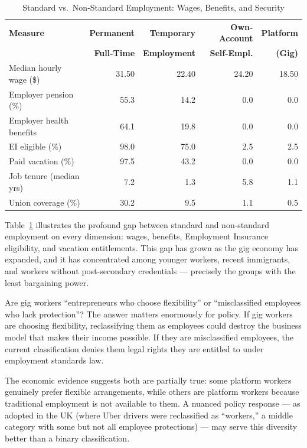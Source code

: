 \begin{table}[H]
\centering
\caption{Standard vs.\ Non-Standard Employment: Wages, Benefits, and Security}
\label{tab:employment_comparison}
\renewcommand{\arraystretch}{1.30}
\begin{tabular}{lrrrr}
\toprule
\textbf{Measure} & \textbf{Permanent} & \textbf{Temporary} & \textbf{Own-Account} & \textbf{Platform} \\
                 & \textbf{Full-Time} & \textbf{Employment} & \textbf{Self-Empl.} & \textbf{(Gig)} \\
\midrule
Median hourly wage (\$)   & 31.50 & 22.40 & 24.20 & 18.50 \\
Employer pension (\%)     &  55.3 &  14.2 &   0.0 &   0.0 \\
Employer health benefits  &  64.1 &  19.8 &   0.0 &   0.0 \\
EI eligible (\%)          &  98.0 &  75.0 &   2.5 &   2.5 \\
Paid vacation (\%)        &  97.5 &  43.2 &   0.0 &   0.0 \\
Job tenure (median yrs)   &   7.2 &   1.3 &   5.8 &   1.1 \\
Union coverage (\%)       &  30.2 &   9.5 &   1.1 &   0.5 \\
\bottomrule
\end{tabular}
\end{table}

Table~\ref{tab:employment_comparison} illustrates the profound gap between
standard and non-standard employment on every dimension: wages, benefits,
Employment Insurance eligibility, and vacation entitlements. This gap has
grown as the gig economy has expanded, and it has concentrated among
younger workers, recent immigrants, and workers without post-secondary
credentials --- precisely the groups with the least bargaining power.

\begin{thinkbox}
Are gig workers ``entrepreneurs who choose flexibility'' or ``misclassified
employees who lack protection''? The answer matters enormously for policy.
If gig workers are choosing flexibility, reclassifying them as employees
could destroy the business model that makes their income possible. If they
are misclassified employees, the current classification denies them legal
rights they are entitled to under employment standards law.

The economic evidence suggests both are partially true: some platform
workers genuinely prefer flexible arrangements, while others are platform
workers because traditional employment is not available to them. A
nuanced policy response --- as adopted in the UK (where Uber drivers
were reclassified as ``workers,'' a middle category with some but not all
employee protections) --- may serve this diversity better than a binary
classification.
\end{thinkbox}

